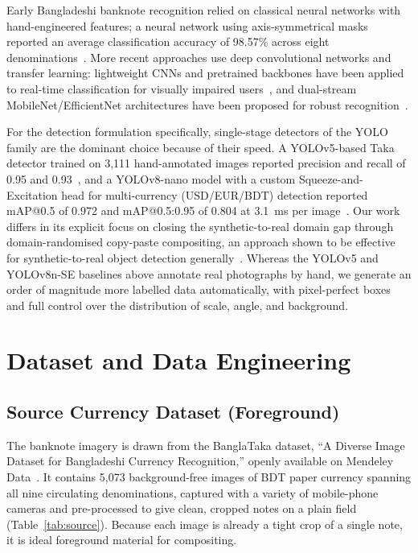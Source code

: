 \documentclass[10pt,twocolumn]{article}
\begin{document}
Early Bangladeshi banknote recognition relied on classical neural networks with hand-engineered features; a neural network using axis-symmetrical masks reported an average classification accuracy of 98.57\% across eight denominations~\cite{ref_axissym}. More recent approaches use deep convolutional networks and transfer learning: lightweight CNNs and pretrained backbones have been applied to real-time classification for visually impaired users~\cite{ref_cnnrealtime}, and dual-stream MobileNet/EfficientNet architectures have been proposed for robust recognition~\cite{ref_dualstream}.

For the detection formulation specifically, single-stage detectors of the YOLO family are the dominant choice because of their speed. A YOLOv5-based Taka detector trained on 3,111 hand-annotated images reported precision and recall of 0.95 and 0.93~\cite{ref_nstubdtaka}, and a YOLOv8-nano model with a custom Squeeze-and-Excitation head for multi-currency (USD/EUR/BDT) detection reported mAP@0.5 of 0.972 and mAP@0.5:0.95 of 0.804 at 3.1~ms per image~\cite{ref_yolov8nse}. Our work differs in its explicit focus on closing the synthetic-to-real domain gap through domain-randomised copy-paste compositing, an approach shown to be effective for synthetic-to-real object detection generally~\cite{ref_domainrand}. Whereas the YOLOv5 and YOLOv8n-SE baselines above annotate real photographs by hand, we generate an order of magnitude more labelled data automatically, with pixel-perfect boxes and full control over the distribution of scale, angle, and background.

\section{Dataset and Data Engineering}

\subsection{Source Currency Dataset (Foreground)}
The banknote imagery is drawn from the BanglaTaka dataset, ``A Diverse Image Dataset for Bangladeshi Currency Recognition,'' openly available on Mendeley Data~\cite{ref_banglataka}. It contains 5,073 background-free images of BDT paper currency spanning all nine circulating denominations, captured with a variety of mobile-phone cameras and pre-processed to give clean, cropped notes on a plain field (Table~\ref{tab:source}). Because each image is already a tight crop of a single note, it is ideal foreground material for compositing.
\end{document}

